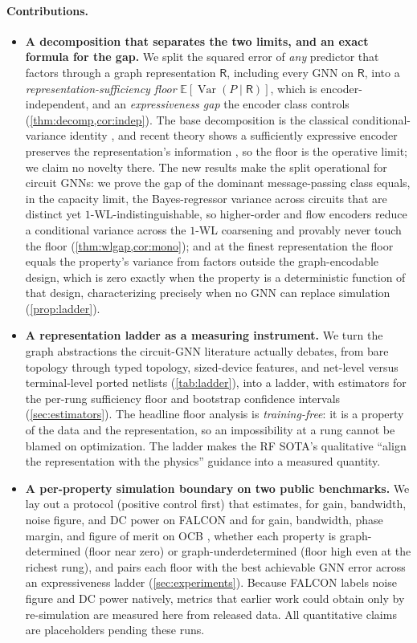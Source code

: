 \documentclass[10pt]{article}
\newcommand{\E}{\mathbb{E}}
\newcommand{\Var}{\operatorname{Var}}
\newcommand{\R}{\mathsf{R}}
\begin{document}
\paragraph{Contributions.}
\begin{itemize}\itemsep2pt
\item \textbf{A decomposition that separates the two limits, and an exact formula for the gap.} We split the squared error of \emph{any} predictor that factors through a graph representation $\R$, including every GNN on $\R$, into a \emph{representation-sufficiency floor} $\E[\Var(P\mid \R)]$, which is encoder-independent, and an \emph{expressiveness gap} the encoder class controls (\cref{thm:decomp,cor:indep}). The base decomposition is the classical conditional-variance identity \citep{hastie2009esl,devroye1996probabilistic,cover2006information}, and recent theory shows a sufficiently expressive encoder preserves the representation's information \citep{shen2025graphsufficiency}, so the floor is the operative limit; we claim no novelty there. The new results make the split operational for circuit GNNs: we prove the gap of the dominant message-passing class equals, in the capacity limit, the Bayes-regressor variance across circuits that are distinct yet $1$-WL-indistinguishable, so higher-order and flow encoders reduce a conditional variance across the $1$-WL coarsening and provably never touch the floor (\cref{thm:wlgap,cor:mono}); and at the finest representation the floor equals the property's variance from factors outside the graph-encodable design, which is zero exactly when the property is a deterministic function of that design, characterizing precisely when no GNN can replace simulation (\cref{prop:ladder}).
\item \textbf{A representation ladder as a measuring instrument.} We turn the graph abstractions the circuit-GNN literature actually debates, from bare topology through typed topology, sized-device features, and net-level versus terminal-level ported netlists \citep{dong2023cktgnn,asadi2025rfinformed,plettenberg2025flow} (\cref{tab:ladder}), into a ladder, with estimators for the per-rung sufficiency floor and bootstrap confidence intervals (\cref{sec:estimators}). The headline floor analysis is \emph{training-free}: it is a property of the data and the representation, so an impossibility at a rung cannot be blamed on optimization. The ladder makes the RF SOTA's qualitative ``align the representation with the physics'' guidance \citep{asadi2025rfinformed} into a measured quantity.
\item \textbf{A per-property simulation boundary on two public benchmarks.} We lay out a protocol (positive control first) that estimates, for gain, bandwidth, noise figure, and DC power on FALCON \citep{mehradfar2025falcon} and for gain, bandwidth, phase margin, and figure of merit on OCB \citep{dong2023cktgnn}, whether each property is graph-determined (floor near zero) or graph-underdetermined (floor high even at the richest rung), and pairs each floor with the best achievable GNN error across an expressiveness ladder (\cref{sec:experiments}). Because FALCON labels noise figure and DC power natively, metrics that earlier work could obtain only by re-simulation are measured here from released data. All quantitative claims are placeholders pending these runs.

\end{itemize}
\end{document}
